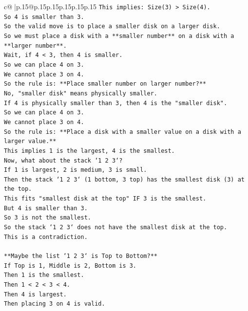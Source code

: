 \documentclass{article}
\begin{document}
{\begin{supertabular}{c@{$\;$}|p{.15\linewidth}@{}p{.15\linewidth}p{.15\linewidth}p{.15\linewidth}p{.15\linewidth}p{.15\linewidth}}
{{{\texttt{This implies: Size(3) > Size(4).} \\
\texttt{So 4 is smaller than 3.} \\
\texttt{So the valid move is to place a smaller disk on a larger disk.} \\
\texttt{So we must place a disk with a **smaller number** on a disk with a **larger number**.} \\
\texttt{Wait, if 4 < 3, then 4 is smaller.} \\
\texttt{So we can place 4 on 3.} \\
\texttt{We cannot place 3 on 4.} \\
\texttt{So the rule is: **Place smaller number on larger number?**} \\
\texttt{No, "smaller disk" means physically smaller.} \\
\texttt{If 4 is physically smaller than 3, then 4 is the "smaller disk".} \\
\texttt{So we can place 4 on 3.} \\
\texttt{We cannot place 3 on 4.} \\
\texttt{So the rule is: **Place a disk with a smaller value on a disk with a larger value.**} \\
\texttt{This implies 1 is the largest, 4 is the smallest.} \\
\texttt{Now, what about the stack `1 2 3`?} \\
\texttt{If 1 is largest, 2 is medium, 3 is small.} \\
\texttt{Then the stack `1 2 3` (1 bottom, 3 top) has the smallest disk (3) at the top.} \\
\texttt{This fits "smallest disk at the top" IF 3 is the smallest.} \\
\texttt{But 4 is smaller than 3.} \\
\texttt{So 3 is not the smallest.} \\
\texttt{So the stack `1 2 3` does not have the smallest disk at the top.} \\
\texttt{This is a contradiction.} \\
\\ 
\texttt{**Maybe the list `1 2 3` is Top to Bottom?**} \\
\texttt{If Top is 1, Middle is 2, Bottom is 3.} \\
\texttt{Then 1 is the smallest.} \\
\texttt{Then 1 < 2 < 3 < 4.} \\
\texttt{Then 4 is largest.} \\
\texttt{Then placing 3 on 4 is valid.} \\
}}}
\end{supertabular}}
\end{document}
